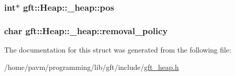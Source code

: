 \hypertarget{structgft_1_1Heap_1_1__heap_a3d65b8de1db1ed23954e74e6718c25b9}{
\subsubsection[{pos}]{\setlength{\rightskip}{0pt plus 5cm}int$\ast$ gft\-::\-Heap\-::\-\_\-heap\-::pos}}\label{structgft_1_1Heap_1_1__heap_a3d65b8de1db1ed23954e74e6718c25b9}
\hypertarget{structgft_1_1Heap_1_1__heap_a5e4f64670064ae421d361d11fe1565b3}{
\subsubsection[{removal\-\_\-policy}]{\setlength{\rightskip}{0pt plus 5cm}char gft\-::\-Heap\-::\-\_\-heap\-::removal\-\_\-policy}}\label{structgft_1_1Heap_1_1__heap_a5e4f64670064ae421d361d11fe1565b3}


The documentation for this struct was generated from the following file\-:\begin{DoxyCompactItemize}
\item 
/home/pavm/programming/lib/gft/include/\hyperlink{gft__heap_8h}{gft\-\_\-heap.\-h}\end{DoxyCompactItemize}
